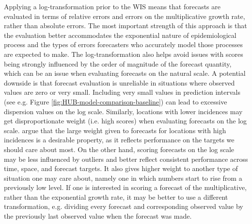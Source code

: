 \documentclass{article}
\begin{document}
Applying a log-transformation prior to the WIS means that forecasts are evaluated in terms of relative errors and errors on the multiplicative growth rate, rather than absolute errors. The most important strength of this approach is that the evaluation better accommodates the exponential nature of epidemiological process and the types of errors forecasters who accurately model those processes are expected to make. The log-transformation also helps avoid issues with scores being strongly influenced by the order of magnitude of the forecast quantity, which can be an issue when evaluating forecasts on the natural scale. 
A potential downside is that forecast evaluation is unreliable in situations where observed values are zero or very small. Including very small values in prediction intervals (see e.g. Figure \ref{fig:HUB-model-comparison-baseline}) can lead to excessive dispersion values on the log scale. 
Similarly, locations with lower incidences may get disproportionate weight (i.e. high scores) when evaluating forecasts on the log scale. \cite{bracherEvaluatingEpidemicForecasts2021} argue that the large weight given to forecasts for locations with high incidences is a desirable property, as it reflects performance on the targets we should care about most. On the other hand, scoring forecasts on the log scale may be less influenced by outliers and better reflect consistent performance across time, space, and forecast targets. It also gives higher weight to another type of situation one may care about, namely one in which numbers start to rise from a previously low level. 
If one is interested in scoring a forecast of the multiplicative, rather than the exponential  growth rate, it may be better to use a different transformation, e.g. dividing every forecast and corresponding observed value by the previously last observed value when the forecast was made. 
\end{document}
